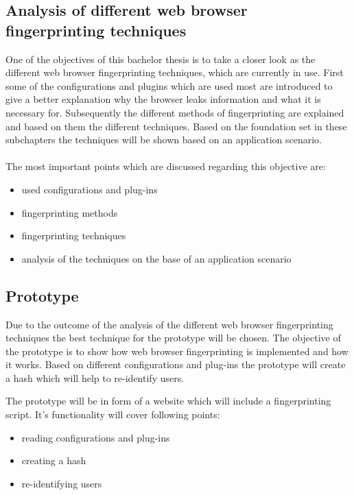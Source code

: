 \subsection{Analysis of different web browser fingerprinting techniques}
One of the objectives of this bachelor thesis is to take a closer look as the different web browser fingerprinting techniques, which are currently in use. 
First some of the configurations and plugins which are used most are introduced to give a better explanation why the browser leaks information and what it is necessary for. Subsequently the different methods of fingerprinting are explained and based on them the different techniques.
Based on the foundation set in these subchapters the techniques will be shown based on an application scenario. \\ 
\\
The most important points which are discussed regarding this objective are:
\begin{itemize}
	\item used configurations and plug-ins
	\item fingerprinting methods
	\item fingerprinting techniques
	\item analysis of the techniques on the base of an application scenario
\end{itemize}

\subsection{Prototype}
Due to the outcome of the analysis of the different web browser fingerprinting techniques the best technique for the prototype will be chosen. The objective of the prototype is to show how web browser fingerprinting is implemented and how it works. Based on different configurations and plug-ins the prototype will create a hash which will help to re-identify users.

The prototype will be in form of a website which will include a fingerprinting script. It's functionality will cover following points:
\begin{itemize}
	\item reading configurations and plug-ins
	\item creating a hash
	\item re-identifying users
\end{itemize}

